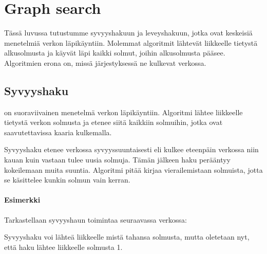 \chapter{Graph search}

Tässä luvussa tutustumme
syvyyshakuun ja leveyshakuun, jotka
ovat keskeisiä menetelmiä verkon läpikäyntiin.
Molemmat algoritmit lähtevät liikkeelle
tietystä alkusolmusta ja 
käyvät läpi kaikki solmut,
joihin alkusolmusta pääsee.
Algoritmien erona on,
missä järjestyksessä ne kulkevat verkossa.

\section{Syvyyshaku}


on suoraviivainen menetelmä verkon läpikäyntiin.
Algoritmi lähtee liikkeelle tietystä
verkon solmusta ja etenee siitä
kaikkiin solmuihin, jotka ovat
saavutettavissa kaaria kulkemalla.

Syvyyshaku etenee verkossa syvyyssuuntaisesti
eli kulkee eteenpäin verkossa niin kauan
kuin vastaan tulee uusia solmuja.
Tämän jälkeen haku perääntyy kokeilemaan
muita suuntia.
Algoritmi pitää kirjaa vierailemistaan solmuista,
jotta se käsittelee kunkin solmun vain kerran.

\subsubsection*{Esimerkki}

Tarkastellaan syvyyshaun toimintaa
seuraavassa verkossa:
\begin{center}
\end{center}
Syvyyshaku voi lähteä liikkeelle
mistä tahansa solmusta,
mutta oletetaan nyt,
että haku lähtee liikkeelle solmusta 1.

